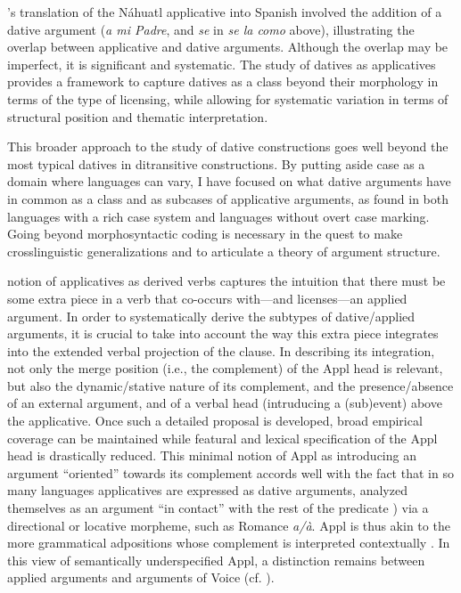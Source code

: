 \documentclass[output=paper,colorlinks,citecolor=brown,nonflat]{./langscibook}
\begin{document}
\citeauthor{Carochi1645}’s translation of the Náhuatl applicative into Spanish involved the addition of a dative argument (\textit{a mi Padre}, and \textit{se} in \textit{se la como} above),  illustrating the overlap between applicative and dative arguments. Although the overlap may be imperfect, it is significant and systematic. The study of datives as applicatives provides a framework to capture datives as a class beyond their morphology in terms of the type of licensing, while allowing for systematic variation in terms of structural position and thematic interpretation. 

This broader approach to the study of dative constructions goes well beyond the most typical datives in ditransitive constructions. By putting aside case as a domain where languages can vary, I have focused on what dative arguments have in common as a class and as subcases of applicative arguments, as found in both languages with a rich case system and languages without overt case marking. Going beyond morphosyntactic coding is necessary in the quest to make crosslinguistic generalizations and to articulate a theory of argument structure.

 notion of applicatives as derived verbs captures the intuition that there must be some extra piece in a verb that co-occurs with—and licenses—an applied argument. In order to systematically derive the subtypes of dative/applied arguments, it is crucial to take into account the way this extra piece integrates into the extended verbal projection of the clause. In describing its integration, not only the merge position (i.e., the complement) of the Appl head is relevant, but also the dynamic/stative nature of its complement, and the presence/absence of an external argument, and of a verbal head (intruducing a (sub)event) above the applicative. Once such a detailed proposal is developed, broad empirical coverage can be maintained while featural and lexical specification of the Appl head is drastically reduced. This minimal notion of Appl as introducing an argument “oriented” towards its complement accords well with the fact that in so many languages applicatives are expressed as dative arguments, analyzed themselves as an argument “in contact” with the rest of the predicate ) via a directional or locative morpheme, such as Romance \textit{a/à}. Appl is thus akin to the more grammatical adpositions whose complement is interpreted contextually \citep{Svenonius2007}. In this view of semantically underspecified Appl, a distinction remains between applied arguments and arguments of Voice (cf. \citealt{WoodMarantz2017}). 
\end{document}
